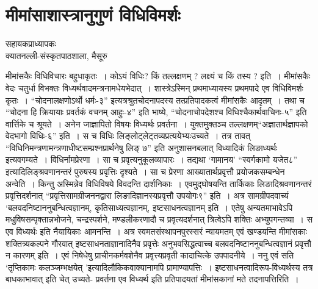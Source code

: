 {\fontsize{15}{17}\selectfont
\presetvalues
\chapter{मीमांसाशास्त्रानुगुणं विधिविमर्शः}

\begin{center}
\smallskip

सहायकप्राध्यापकः\\ 
क्यातनल्ली-संस्कृतपाठशाला, मैसूरु
\addrule
\end{center}

मीमांसकैः विधिविचारः बहुधाकृतः~। कोऽयं विधिः? किं तल्लक्षणम् ? लक्ष्यं च किं तस्य ? इति~। मीमांसकैः वेदः चतुर्धा विभक्तः विध्यर्थवादमन्त्रनामधेयभेदात्~।  शास्त्रेऽस्मिन् प्रथमाध्यायस्य प्रथमपादे एव विधिविमर्शः कृतः~। “चोदनालक्षणोऽर्थो धर्मः-३” इत्यत्र\break श्रुतचोदनापदस्य तत्प्रतिपादकत्वं मीमांसकैः आदृतम्~। तथा च “चोदना हि क्रियायाः \hbox{प्रवर्तकं} वचनम् आहुः-४”  इति भाष्ये, “चोदनाचोपदेशश्च विधिश्चैकार्थवाचिनः-५” इति वार्त्तिके च श्रूयते~। अनेन जाज्ञापितो विषयः विध्यर्थः प्रवर्तना~। युक्तमुक्तञ्च तल्लक्षणम्\break “अज्ञातार्थज्ञापको वेदभागो विधिः-६” इति~। स च विधिः लिङ्लोट्लेट्तव्यप्रत्ययेभ्यः\break उच्यते~। तत्र \hbox{तावत्} “विधिनिमन्त्रणामन्त्रणाधीष्टसम्प्रश्नप्रार्थनेषु लिङ् ७” इति अनुशासनबलात् \hbox{विध्यादिकं} \hbox{लिङाध्यर्थः} इत्यवगम्यते~। विधिर्नामप्रेरणा~। सा च प्रवृत्यनुकूलव्यापारः~। तद्यथा ‘गामानय’ “स्वर्गकामो यजेत८” इत्यादिलिङ्श्रवणानन्तरं पुरुषस्य प्रवृत्तिः दृश्यते~। सा च प्रेरणा आख्यातार्थप्रवृत्तौ प्रयोजकसम्बन्धेन अन्वेति~। किन्तु अस्मिन्नेव विधिविषये विवदन्ति दार्शनिकाः~। एवमुद्घोषयन्ति तार्किकाः लिङादिश्रवणानन्तरं प्रवृत्तिदर्शनात् “प्रवृत्तिसामग्रीजननद्वारा  लिङादिज्ञानस्यप्रवृत्तौ उपयोगः९” इति~। अत्र सामग्रीपदवाच्यं ‘बलवदनिष्टाननुबन्धित्वज्ञानम्, कृतिसाध्यत्वज्ञानम्, इष्टसाधनत्वज्ञानम् इति~। एतेषु अन्यतमाभावेऽपि मधुविषसम्पृक्तान्नभोजने, चन्द्रस्पर्शने, मण्डलीकरणादौ च प्रवृत्यदर्शनात् त्रित्वेऽपि शक्तिः अभ्युपगन्तव्या~। स एव विध्यर्थः इति नैयायिकाः आमनन्ति~। अत्र स्वमतसंस्थापनपुरस्सरं न्यायमतम् एवं खण्डयन्ति मीमांसकाः शक्तित्र्यकल्पने गौरवात् इष्टसाधनताज्ञानादिनैव प्रवृत्तेः अनुभवसिद्धत्वाच्च बलवदनिष्टाननुबन्धित्वज्ञानं प्रवृत्तौ न कारणम् इति~। एवं निषेधेषु प्राचीनकर्मवशेनैव प्रवृत्त्यप्रवृती कादाचित्के उपपादनीये~। ननु एवं सति ‘तृप्तिकामः कलञ्जम्भक्षयेत् ’इत्यादिलौकिकवाक्यानामपि प्रामाण्यापत्तिः~। इष्टसाधनत्वादिरूप-विध्यर्थस्य तत्र बाधकाभावात् इति चेत् उच्यते- प्रवर्तना एव विध्यर्थ इति प्रतिपादयतां मीमांसकानां मते तदनापत्तिरिति~। 

}
